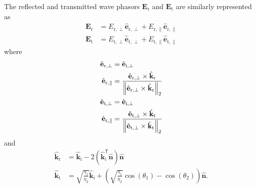 The reflected and transmitted wave phasors $\mathbf{E}_\text{r}$ and $\mathbf{E}_\text{t}$ are similarly represented as
\begin{align}
    \mathbf{E}_\text{r} &= E_{\text{r},\perp} \hat{\mathbf{e}}_{\text{r},\perp} + E_{\text{r},\parallel} \hat{\mathbf{e}}_{\text{r},\parallel}\\
    \mathbf{E}_\text{t} &= E_{\text{t},\perp} \hat{\mathbf{e}}_{\text{t},\perp} + E_{\text{t},\parallel} \hat{\mathbf{e}}_{\text{t},\parallel}
\end{align}
where
\begin{equation}
    \label{eq:fresnel_out_vectors}
    \begin{aligned}
        \hat{\mathbf{e}}_{\text{r},\perp} &= \hat{\mathbf{e}}_{\text{i},\perp}\\
        \hat{\mathbf{e}}_{\text{r},\parallel} &= \frac{\hat{\mathbf{e}}_{\text{r},\perp}\times\hat{\mathbf{k}}_\text{r}}{\left\lVert\hat{\mathbf{e}}_{\text{r},\perp}\times\hat{\mathbf{k}}_\text{r}\right\rVert_2}\\
        \hat{\mathbf{e}}_{\text{t},\perp} &= \hat{\mathbf{e}}_{\text{i},\perp}\\
        \hat{\mathbf{e}}_{\text{t},\parallel} &= \frac{\hat{\mathbf{e}}_{\text{t},\perp}\times\hat{\mathbf{k}}_\text{t}}{ \left\lVert\hat{\mathbf{e}}_{\text{t},\perp}\times\hat{\mathbf{k}}_\text{t} \right\rVert_2}
    \end{aligned}
\end{equation}
and
\begin{equation}
    \label{eq:reflected_refracted_vectors}
    \begin{aligned}
        \hat{\mathbf{k}}_\text{r} &= \hat{\mathbf{k}}_\text{i} - 2\left( \hat{\mathbf{k}}_\text{i}^\mathsf{T}\hat{\mathbf{n}} \right)\hat{\mathbf{n}}\\
        \hat{\mathbf{k}}_\text{t} &= \sqrt{\frac{\eta_1}{\eta_2}} \hat{\mathbf{k}}_\text{i} + \left(\sqrt{\frac{\eta_1}{\eta_2}}\cos(\theta_1) - \cos(\theta_2) \right)\hat{\mathbf{n}}.
    \end{aligned}
\end{equation}

